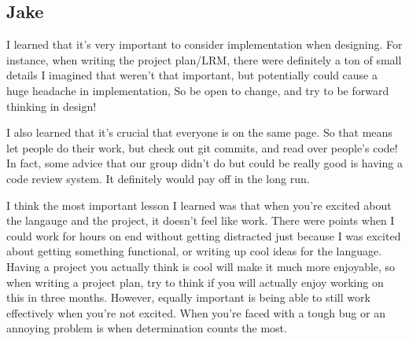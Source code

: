\subsection{Jake}

I learned that it's very important to consider implementation when designing.  For instance, when writing the project plan/LRM, there were definitely a ton of small details I imagined that weren't that important, but potentially could cause a huge headache in implementation,  So be open to change, and try to be forward thinking in design!

I also learned that it's crucial that everyone is on the same page.  So that means let people do their work, but check out git commits, and read over people's code!  In fact, some advice that our group didn't do but could be really good is having a code review system.  It definitely would pay off in the long run.

I think the most important lesson I learned was that when you're excited about the langauge and the project, it doesn't feel like work.  There were points when I could work for hours on end without getting distracted just because I was excited about getting something functional, or writing up cool ideas for the language.  Having a project you actually think is cool will make it much more enjoyable, so when writing a project plan, try to think if you will actually enjoy working on this in three months.  However, equally important is being able to still work effectively when you're not excited.  When you're faced with a tough bug or an annoying problem is when determination counts the most.
